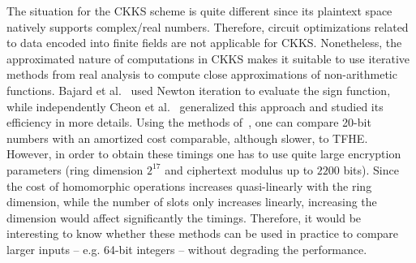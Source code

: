 The situation for the CKKS scheme is quite different since its plaintext space natively supports complex/real numbers. 
Therefore, circuit optimizations related to data encoded into finite fields are not applicable for CKKS. 
Nonetheless, the approximated nature of computations in CKKS makes it suitable to use iterative methods from real analysis to compute close approximations of non-arithmetic functions. 
Bajard et al.~\cite{BMSZ20} used Newton iteration to evaluate the sign function, while independently Cheon et al.~\cite{AC:CKKLL19,EPRINT:CheKimKim19} generalized this approach and studied its efficiency in more details. 
Using the methods of~\cite{EPRINT:CheKimKim19}, one can compare 20-bit numbers with an amortized cost comparable, although slower, to TFHE. 
However, in order to obtain these timings one has to use quite large encryption parameters (ring dimension $2^{17}$ and ciphertext modulus up to $2200$ bits). 
Since the cost of homomorphic operations increases quasi-linearly with the ring dimension, while the number of slots only increases linearly, increasing the dimension would affect significantly the timings. 
Therefore, it would be interesting to know whether these methods can be used in practice to compare larger inputs -- e.g. 64-bit integers -- without degrading the performance. 




  

